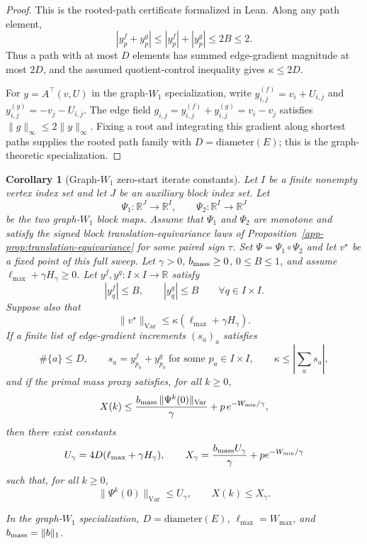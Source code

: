 \documentclass{article}
\theoremstyle{plain}
\newtheorem{corollary}{Corollary}[section]
\newcommand{\Edge}{E}
\newcommand{\length}{W}
\newcommand{\RR}{\mathbb{R}}
\newcommand{\norm}[1]{\|#1\|}
\newcommand{\normVar}[1]{\norm{#1}_{\mathrm{Var}}}
\begin{document}
\begin{proof}
This is the rooted-path certificate formalized in Lean.  Along any
path element,
\[
  |y^f_p+y^g_p|\le |y^f_p|+|y^g_p|\le 2B\le2 .
\]
Thus a path with at most $D$ elements has summed edge-gradient magnitude at
most $2D$, and the assumed quotient-control inequality gives
$\kappa\le2D$.

For $y=A^\top(v,U)$ in the graph-$W_1$ specialization, write
$y^{(f)}_{i,j}=v_i+U_{i,j}$ and
$y^{(g)}_{i,j}=-v_j-U_{i,j}$.  The edge field
$g_{i,j}=y^{(f)}_{i,j}+y^{(g)}_{i,j}=v_i-v_j$ satisfies
$\|g\|_\infty\le2\|y\|_\infty$.  Fixing a root and integrating this gradient
along shortest paths supplies the rooted path family with
$D=\mathrm{diameter}(\Edge)$; this is the graph-theoretic specialization.
\end{proof}

\begin{corollary}[Graph-$W_1$ zero-start iterate constants]\label{app-cor:graphw1-xgamma-ugamma}
Let $I$ be a finite nonempty vertex index set and let $J$ be an
auxiliary block index set.  Let
\[
  \Psi_1:\RR^J\to\RR^I,\qquad
  \Psi_2:\RR^I\to\RR^J
\]
be the two graph-$W_1$ block maps.  Assume that $\Psi_1$ and $\Psi_2$
are monotone and satisfy the signed block translation-equivariance
laws of Proposition~\ref{app-prop:translation-equivariance} for some
paired sign $\tau$.  Set $\Psi=\Psi_1\circ\Psi_2$ and let
$v^\star$ be a fixed point of this full sweep.  Let
$\gamma>0$, $b_{\rm mass}\ge0$, $0\le B\le1$, and assume
$\ell_{\max}+\gamma H_\gamma\ge0$.  Let
$y^f,y^g:I\times I\to\RR$ satisfy
\[
  |y^f_q|\le B,\qquad |y^g_q|\le B\qquad\forall q\in I\times I .
\]
Suppose also that
\[
  \normVar{v^\star}\le \kappa(\ell_{\max}+\gamma H_\gamma).
\]
If a finite list of edge-gradient increments $(s_a)_a$ satisfies
\[
  \#\{a\}\le D,\qquad
  s_a=y^f_{p_a}+y^g_{p_a}\ \text{for some }p_a\in I\times I,\qquad
  \kappa\le\left|\sum_a s_a\right|,
\]
and if the primal mass proxy satisfies, for all $k\ge0$,
\[
  X(k)\le
  \frac{b_{\rm mass}\,\normVar{\Psi^k(0)}}{\gamma}
  +p\,e^{-\length_{\min}/\gamma},
\]
then there exist constants
\[
  U_\gamma=4D(\ell_{\max}+\gamma H_\gamma),
  \qquad
  X_\gamma=\frac{b_{\rm mass}U_\gamma}{\gamma}
    +p e^{-\length_{\min}/\gamma}
\]
such that, for all $k\ge0$,
\[
  \normVar{\Psi^k(0)}\le U_\gamma,
  \qquad
  X(k)\le X_\gamma .
\]

In the graph-$W_1$ specialization, $D=\mathrm{diameter}(\Edge)$,
$\ell_{\max}=\length_{\max}$, and $b_{\rm mass}=\|b\|_1$.
\end{corollary}
\end{document}
